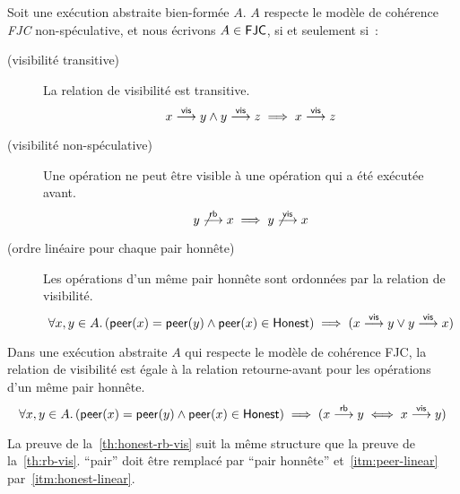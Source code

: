 \begin{definition}\label{def:fjc-consistency}
  Soit une exécution abstraite bien-formée $A$. $A$ respecte le modèle de cohérence \emph{\acf{FJC}} non-spéculative, et nous écrivons $A \in \operatorname{\mathsf{FJC}}$, si et seulement si~:

  \begin{description}
  \item[ (visibilité transitive)]
  La relation de visibilité est transitive.
  \begin{equation*}
    x \overset{\mathsf{vis}}{\longrightarrow} y \land y \overset{\mathsf{vis}}{\longrightarrow} z \implies x \overset{\mathsf{vis}}{\longrightarrow} z
  \end{equation*}

  \item[ (visibilité non-spéculative)]
  Une opération ne peut être visible à une opération qui a été exécutée avant.
  \begin{equation*}
    y \not\overset{\mathsf{rb}}{\longrightarrow} x \implies y \not\overset{\mathsf{vis}}{\longrightarrow} x
  \end{equation*}

  \item[ (ordre linéaire pour chaque pair honnête)]
  Les opérations d'un même pair honnête sont ordonnées par la relation de visibilité.
  \begin{equation*}
    \forall x, y \in A \ldotp (\operatorname{\mathsf{peer}}(x) = \operatorname{\mathsf{peer}}(y) \land \operatorname{\mathsf{peer}}(x) \in \operatorname{\mathsf{Honest}}) \implies (x \overset{\mathsf{vis}}{\longrightarrow} y \lor y \overset{\mathsf{vis}}{\longrightarrow} x)
  \end{equation*}
  \end{description}
\end{definition}

\begin{proposition}\label{th:honest-rb-vis}
Dans une exécution abstraite $A$ qui respecte le modèle de cohérence \ac{FJC}, la relation de visibilité est égale à la relation retourne-avant pour les opérations d'un même pair honnête.
\begin{equation*}
    \forall x, y \in A \ldotp (\operatorname{\mathsf{peer}}(x) = \operatorname{\mathsf{peer}}(y) \land \operatorname{\mathsf{peer}}(x) \in \operatorname{\mathsf{Honest}}) \implies (x \overset{\mathsf{rb}}{\longrightarrow} y \iff x \overset{\mathsf{vis}}{\longrightarrow} y)
\end{equation*}
\end{proposition}

La preuve de la~\autoref{th:honest-rb-vis} suit la même structure que la preuve de la~\autoref{th:rb-vis}.
\enquote{pair} doit être remplacé par \enquote{pair honnête} et~\ref{itm:peer-linear} par~\ref{itm:honest-linear}.

